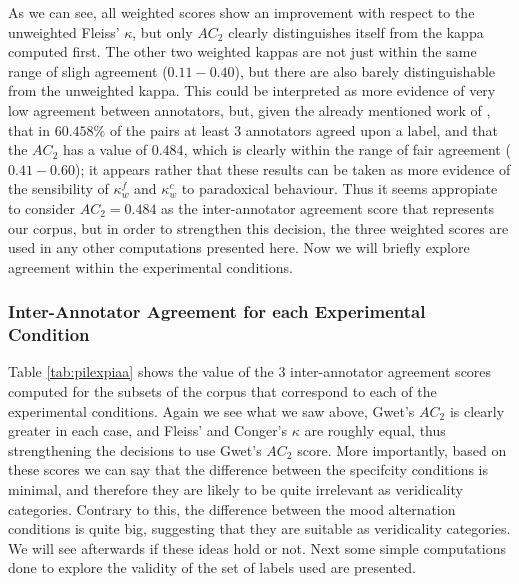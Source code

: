 As we can see, all weighted scores show an improvement with respect to the unweighted Fleiss' $\kappa$, but only $AC_2$ clearly distinguishes itself from the kappa computed first. The other two weighted kappas are not just within the same range of sligh agreement ($0.11-0.40$), but there are also barely distinguishable from the unweighted kappa. This could be interpreted as more evidence of very low agreement between annotators, but, given the already mentioned work of \citet{vanacore2022robustness}, that in $60.458\%$ of the pairs at least 3 annotators agreed upon a label, and that the $AC_2$ has a value of $0.484$, which is clearly within the range of fair agreement ($0.41-0.60$); it appears rather that these results can be taken as more evidence of the sensibility of $\kappa^{f}_{w}$ and $\kappa^{c}_{w}$ to paradoxical behaviour. Thus it seems appropiate to consider $AC_2=0.484$ as the inter-annotator agreement score that represents our corpus, but in order to strengthen this decision, the three weighted scores are used in any other computations presented here. Now we will briefly explore agreement within the experimental conditions.\\

\subsubsection{Inter-Annotator Agreement for each Experimental Condition}
\label{subsubsec:expiaa}
Table \ref{tab:pilexpiaa} shows the value of the 3 inter-annotator agreement scores computed for the subsets of the corpus that correspond to each of the experimental conditions. Again we see what we saw above, Gwet's $AC_2$ is clearly greater in each case, and Fleiss' and Conger's $\kappa$ are roughly equal, thus strengthening the decisions to use Gwet's $AC_2$ score. More importantly, based on these scores we can say that the difference between the specifcity conditions is minimal, and therefore they are likely to be quite irrelevant as veridicality categories. Contrary to this, the difference between the mood alternation conditions is quite big, suggesting that they are suitable as veridicality categories. We will see afterwards if these ideas hold or not. Next some simple computations done to explore the validity of the set of labels used are presented.\\

